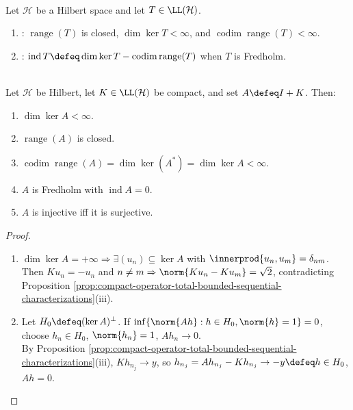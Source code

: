 \begin{definition} \label{def:fredholm-operator-index} \\
Let $\mathcal{H}$ be a Hilbert space and let $T\in\LL(\mathcal{H})$.
\begin{enumerate}[label=(\roman*)]
\setlength{\itemsep}{0pt}
\item {}: $\operatorname{range}(T)$ is closed, $\dim\ker T<\infty$, and $\operatorname{codim}\operatorname{range}(T)<\infty$.
\item {}: $\operatorname{ind}T\defeq\dim\ker T-\operatorname{codim}\operatorname{range}(T)$ when $T$ is Fredholm.
\end{enumerate}
\end{definition}

\begin{theorem} \label{thm:riesz-schauder-compact-perturbation-identity} \\
Let $\mathcal{H}$ be Hilbert, let $K\in\LL(\mathcal{H})$ be compact, and set $A\defeq I+K$. Then:
\begin{enumerate}[label=(\roman*)]
\setlength{\itemsep}{0pt}
\item $\dim\ker A<\infty$.
\item $\operatorname{range}(A)$ is closed.
\item $\operatorname{codim}\operatorname{range}(A)=\dim\ker(A^*)=\dim\ker A<\infty$.
\item $A$ is Fredholm with $\operatorname{ind}A=0$.
\item $A$ is injective iff it is surjective.
\end{enumerate}
\begin{proof}
\begin{enumerate}[label=(\roman*)]
\setlength{\itemsep}{0pt}
\item $\dim\ker A=+\infty\Rightarrow\exists(u_n)\subseteq\ker A$ with $\innerprod{u_n,u_m}=\delta_{nm}$.\\
Then $Ku_n=-u_n$ and $n\neq m\Rightarrow\norm{Ku_n-Ku_m}=\sqrt2$, contradicting Proposition \ref{prop:compact-operator-total-bounded-sequential-characterizations}(iii).
\item Let $H_0\defeq(\ker A)^\perp$. If $\inf\{\norm{Ah}:h\in H_0,\norm{h}=1\}=0$, choose $h_n\in H_0$, $\norm{h_n}=1$, $Ah_n\to0$.\\
By Proposition \ref{prop:compact-operator-total-bounded-sequential-characterizations}(iii), $Kh_{n_j}\to y$, so $h_{n_j}=Ah_{n_j}-Kh_{n_j}\to-y\defeq h\in H_0$, $Ah=0$.\\

\end{enumerate}
\end{proof}
\end{theorem}
